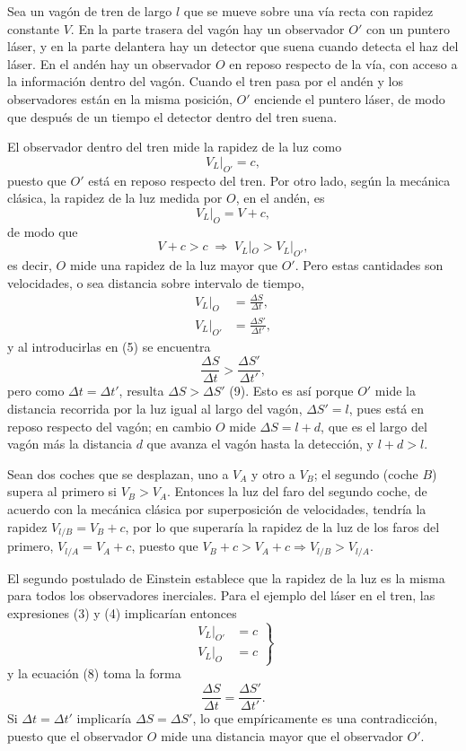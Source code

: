 \begin{ejemplo}
Sea un vagón de tren de largo $l$ que se mueve sobre una vía recta con
rapidez constante $V$. En la parte trasera del vagón hay un observador
$O'$ con un puntero láser, y en la parte delantera hay un detector que
suena cuando detecta el haz del láser. En el andén hay un observador $O$
en reposo respecto de la vía, con acceso a la información dentro del
vagón. Cuando el tren pasa por el andén y los observadores están en la
misma posición, $O'$ enciende el puntero láser, de modo que después de
un tiempo el detector dentro del tren suena.

El observador dentro del tren mide la rapidez de la luz como
\[
V_L|_{O'} = c, \tag{3}
\]
puesto que $O'$ está en reposo respecto del tren. Por otro lado, según
la mecánica clásica, la rapidez de la luz medida por $O$, en el andén,
es
\[
V_L|_{O} = V+c, \tag{4}
\]
de modo que
\[
V+c>c \;\Longrightarrow\; V_L|_O > V_L|_{O'}, \tag{5}
\]
es decir, $O$ mide una rapidez de la luz mayor que $O'$. Pero estas
cantidades son velocidades, o sea distancia sobre intervalo de tiempo,
\begin{align*}
V_L|_O &= \frac{\Delta S}{\Delta t}, \tag{6}\\
V_L|_{O'} &= \frac{\Delta S'}{\Delta t'}, \tag{7}
\end{align*}
y al introducirlas en (5) se encuentra
\[
\frac{\Delta S}{\Delta t} > \frac{\Delta S'}{\Delta t'}, \tag{8}
\]
pero como $\Delta t=\Delta t'$, resulta $\Delta S>\Delta S'$ (9). Esto es
así porque $O'$ mide la distancia recorrida por la luz igual al largo
del vagón, $\Delta S'=l$, pues está en reposo respecto del vagón; en
cambio $O$ mide $\Delta S=l+d$, que es el largo del vagón más la
distancia $d$ que avanza el vagón hasta la detección, y $l+d>l$.
\end{ejemplo}

\begin{ejemplo}
Sean dos coches que se desplazan, uno a $V_A$ y otro a $V_B$; el
segundo (coche $B$) supera al primero si $V_B>V_A$. Entonces la luz del
faro del segundo coche, de acuerdo con la mecánica clásica por
superposición de velocidades, tendría la rapidez $V_{l/B}=V_B+c$, por lo
que superaría la rapidez de la luz de los faros del primero,
$V_{l/A}=V_A+c$, puesto que $V_B+c>V_A+c \Rightarrow V_{l/B}>V_{l/A}$.
\end{ejemplo}

El segundo postulado de Einstein establece que la rapidez de la luz es
la misma para todos los observadores inerciales. Para el ejemplo del
láser en el tren, las expresiones (3) y (4) implicarían entonces
\[
\left.\begin{aligned} V_L|_{O'} &= c \\ V_L|_{O} &= c \end{aligned}
\right\} \tag{10}
\]
y la ecuación (8) toma la forma
\[
\frac{\Delta S}{\Delta t} = \frac{\Delta S'}{\Delta t'} . \tag{11}
\]
Si $\Delta t=\Delta t'$ implicaría $\Delta S=\Delta S'$, lo que
empíricamente es una contradicción, puesto que el observador $O$ mide
una distancia mayor que el observador $O'$.

